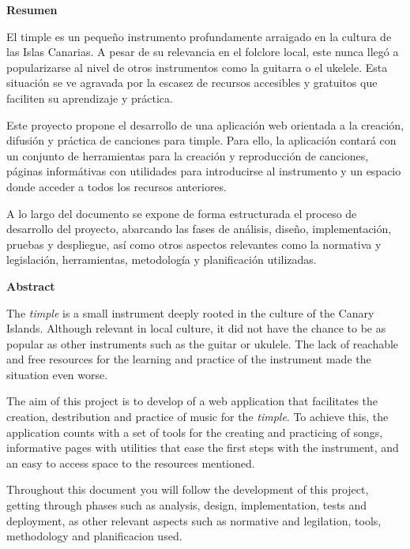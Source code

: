 {\setlength{\parskip}{8mm}
{\huge{\textbf{Resumen}}}

{\large{

El \gls{timple} es un pequeño instrumento profundamente arraigado en la cultura de las Islas Canarias. A pesar de su relevancia en el folclore local, este nunca llegó a popularizarse al nivel de otros instrumentos como la guitarra o el ukelele. Esta situación se ve agravada por la escasez de recursos accesibles y gratuitos que faciliten su aprendizaje y práctica.

Este proyecto propone el desarrollo de una aplicación web orientada a la creación, difusión y práctica de canciones para timple. Para ello, la aplicación contará con un conjunto de herramientas para la creación y reproducción de canciones, páginas informátivas con utilidades para introducirse al instrumento y un espacio donde acceder a todos los recursos anteriores.

A lo largo del documento se expone de forma estructurada el proceso de desarrollo del proyecto, abarcando las fases de análisis, diseño, implementación, pruebas y despliegue, así como otros aspectos relevantes como la normativa y legislación, herramientas, metodología y planificación utilizadas.

}}

\newpage

{\huge{\textbf{Abstract}}}


{\large{

The \emph{\gls{timple}} is a small instrument deeply rooted in the culture of the  Canary Islands. Although relevant in local culture, it did not have the chance to be as popular as other instruments such as the guitar or ukulele. The lack of reachable and free resources for the learning and practice of the instrument made the situation even worse.

The aim of this project is to develop of a web application that facilitates the creation, destribution and practice of music for the \emph{timple}. To achieve this, the application counts with a set of tools for the creating and practicing of songs, informative pages with utilities that ease the first steps with the instrument, and an easy to access space to the resources mentioned.

Throughout this document you will follow the development of this project, getting through phases such as analysis, design, implementation, tests and deployment, as other relevant aspects such as normative and legilation, tools, methodology and planificacion used.

}

}}